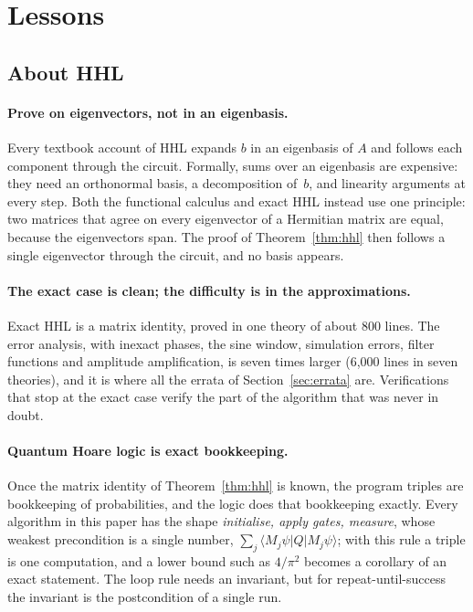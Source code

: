 \section{Lessons}\label{sec:lessons}

\subsection{About HHL}

\paragraph{Prove on eigenvectors, not in an eigenbasis.} Every textbook account of HHL expands $b$ in an
eigenbasis of $A$ and follows each component through the circuit. Formally, sums over an eigenbasis
are expensive: they need an orthonormal basis, a decomposition of~$b$, and linearity arguments at every
step. Both the functional calculus and exact HHL instead use one principle: two matrices that agree on
every eigenvector of a Hermitian matrix are equal, because the eigenvectors span. The proof of
Theorem~\ref{thm:hhl} then follows a single eigenvector through the circuit, and no basis appears.

\paragraph{The exact case is clean; the difficulty is in the approximations.} Exact HHL is a matrix
identity, proved in one theory of about 800 lines. The error analysis, with inexact phases, the sine window,
simulation errors, filter functions and amplitude amplification, is seven times larger (6{,}000 lines in seven
theories), and it is where all the errata of Section~\ref{sec:errata} are. Verifications that stop at the exact case
verify the part of the algorithm that was never in doubt.

\paragraph{Quantum Hoare logic is exact bookkeeping.} Once the matrix identity of
Theorem~\ref{thm:hhl} is known, the program triples are bookkeeping of probabilities, and the logic does
that bookkeeping exactly. Every algorithm in this paper has the shape \emph{initialise, apply gates,
measure}, whose weakest precondition is a single number, $\sum_j\langle M_j\psi|Q|M_j\psi\rangle$; with
this rule a triple is one computation, and a lower bound such as $4/\pi^2$ becomes a corollary of an
exact statement. The loop rule needs an invariant, but for repeat-until-success the invariant is the
postcondition of a single run.

